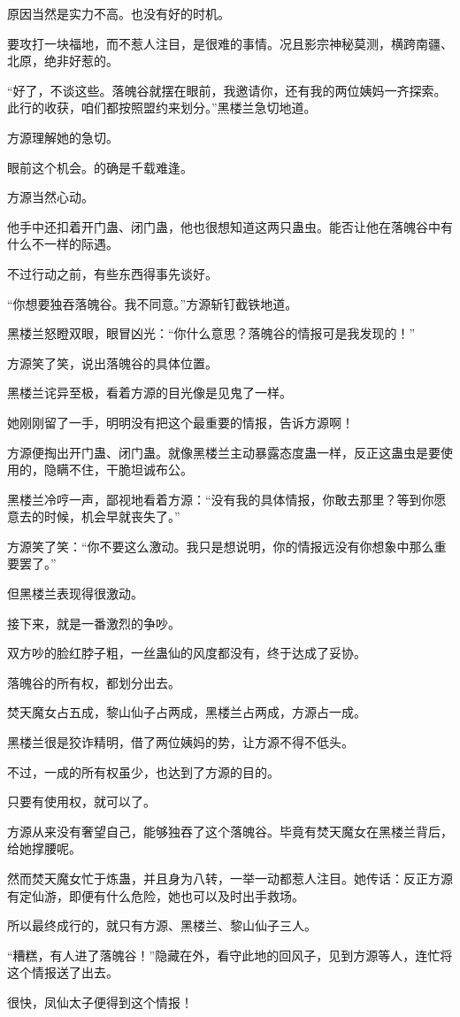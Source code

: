 \begin{this_body}
原因当然是实力不高。也没有好的时机。

要攻打一块福地，而不惹人注目，是很难的事情。况且影宗神秘莫测，横跨南疆、北原，绝非好惹的。

“好了，不谈这些。落魄谷就摆在眼前，我邀请你，还有我的两位姨妈一齐探索。此行的收获，咱们都按照盟约来划分。”黑楼兰急切地道。

方源理解她的急切。

眼前这个机会。的确是千载难逢。

方源当然心动。

他手中还扣着开门蛊、闭门蛊，他也很想知道这两只蛊虫。能否让他在落魄谷中有什么不一样的际遇。

不过行动之前，有些东西得事先谈好。

“你想要独吞落魄谷。我不同意。”方源斩钉截铁地道。

黑楼兰怒瞪双眼，眼冒凶光：“你什么意思？落魄谷的情报可是我发现的！”

方源笑了笑，说出落魄谷的具体位置。

黑楼兰诧异至极，看着方源的目光像是见鬼了一样。

她刚刚留了一手，明明没有把这个最重要的情报，告诉方源啊！

方源便掏出开门蛊、闭门蛊。就像黑楼兰主动暴露态度蛊一样，反正这蛊虫是要使用的，隐瞒不住，干脆坦诚布公。

黑楼兰冷哼一声，鄙视地看着方源：“没有我的具体情报，你敢去那里？等到你愿意去的时候，机会早就丧失了。”

方源笑了笑：“你不要这么激动。我只是想说明，你的情报远没有你想象中那么重要罢了。”

但黑楼兰表现得很激动。

接下来，就是一番激烈的争吵。

双方吵的脸红脖子粗，一丝蛊仙的风度都没有，终于达成了妥协。

落魄谷的所有权，都划分出去。

焚天魔女占五成，黎山仙子占两成，黑楼兰占两成，方源占一成。

黑楼兰很是狡诈精明，借了两位姨妈的势，让方源不得不低头。

不过，一成的所有权虽少，也达到了方源的目的。

只要有使用权，就可以了。

方源从来没有奢望自己，能够独吞了这个落魄谷。毕竟有焚天魔女在黑楼兰背后，给她撑腰呢。

然而焚天魔女忙于炼蛊，并且身为八转，一举一动都惹人注目。她传话：反正方源有定仙游，即便有什么危险，她也可以及时出手救场。

所以最终成行的，就只有方源、黑楼兰、黎山仙子三人。

“糟糕，有人进了落魄谷！”隐藏在外，看守此地的回风子，见到方源等人，连忙将这个情报送了出去。

很快，凤仙太子便得到这个情报！

\end{this_body}

